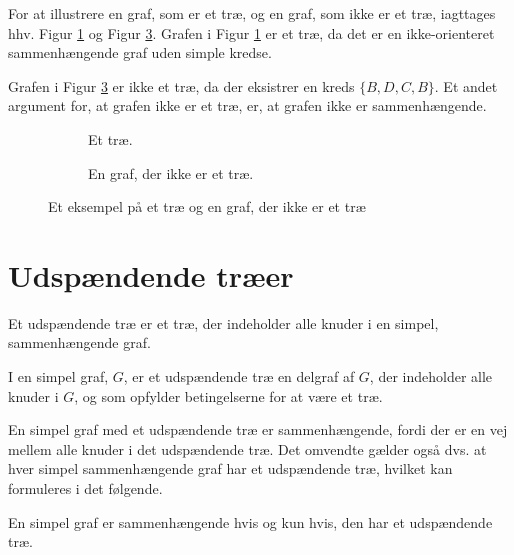 \begin{exmp}
For at illustrere en graf, som er et træ, og en graf, som ikke er et træ, iagttages hhv. Figur \ref{eksempel_tree} og Figur \ref{eksempel_notree}. Grafen i Figur \ref{eksempel_tree} er et træ, da det er en ikke-orienteret sammenhængende graf uden simple kredse.

Grafen i Figur \ref{eksempel_notree} er ikke et træ, da der eksistrer en kreds $\lbrace B, D, C, B \rbrace$. 
Et andet argument for, at grafen ikke er et træ, er, at grafen ikke er sammenhængende.
\end{exmp}

\begin{figure}[h]
\centering
	\begin{subfigure}{0.5\textwidth}
		\centering
			\scalebox{0.9}{}
		\caption{Et træ.} 
		\label{eksempel_tree}
	\end{subfigure}%
	\begin{subfigure}{0.5\textwidth}
		\centering		
			\scalebox{0.9}{}
		\caption{En graf, der ikke er et træ.} 
		\label{eksempel_notree}
	\end{subfigure}
\caption{Et eksempel på et træ og en graf, der ikke er et træ}
\end{figure}

\section{Udspændende træer}

Et udspændende træ er et træ, der indeholder alle knuder i en simpel, sammenhængende graf.

\begin{defn}
I en simpel graf, $G$, er et udspændende træ en delgraf af $G$, der indeholder alle knuder i $G$, og som opfylder betingelserne for at være et træ.
\end{defn}

En simpel graf med et udspændende træ er sammenhængende, fordi der er en vej mellem alle knuder i det udspændende træ.
Det omvendte gælder også dvs. at hver simpel sammenhængende graf har et udspændende træ, hvilket kan formuleres i det følgende.

\begin{thm}
En simpel graf er sammenhængende hvis og kun hvis, den har et udspændende træ.
\end{thm}

